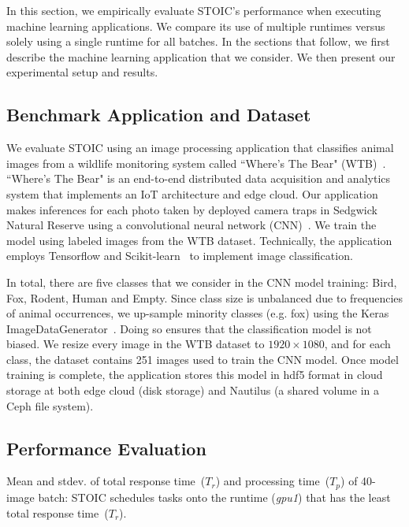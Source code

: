 In this section, we empirically evaluate STOIC's performance when executing machine learning applications. We compare its use of multiple runtimes
versus solely using a single runtime for all batches.  In the sections
that follow, we first describe 
the machine learning application that we consider. We then
present our experimental setup and results. 

\subsection{Benchmark Application and Dataset}

We evaluate STOIC using an image processing application that classifies animal images from a wildlife monitoring system called ``Where's The Bear" (WTB)~\cite{ref:wtb}. ``Where's The Bear" is an end-to-end distributed data acquisition and analytics system that implements an IoT architecture and edge cloud. Our application makes inferences for each photo taken by deployed camera traps in Sedgwick Natural Reserve using a convolutional neural network (CNN)~\cite{ref:cnn}.  We train the model using labeled images from the WTB dataset. Technically, the application employs Tensorflow and Scikit-learn~\cite{ref:scikit} to implement 
image classification.  

In total, there are five classes that we consider in the CNN model training: Bird, Fox, Rodent, Human and Empty. Since class size is unbalanced due to frequencies of animal occurrences, we up-sample minority classes (e.g. fox) using the Keras ImageDataGenerator~\cite{ref:keras}.  Doing so ensures that the classification model is not biased. We resize every image in the WTB dataset to $1920 \times 1080$, and for each class, the dataset contains 251 images used to train the CNN model. Once model training is complete, the application stores this model in hdf5 format in cloud storage at both edge cloud (disk storage) and Nautilus (a shared volume in a Ceph file system).

\subsection{Performance Evaluation}

\begin{table}[t] \centering 

\caption{Mean and stdev. of total response time~($T_r$) and processing time~($T_p$) of 40-image batch: STOIC schedules tasks onto the runtime (\textit{gpu1}) that has the least total response time~($T_r$).
\label{tab:validation}}
\end{table}

